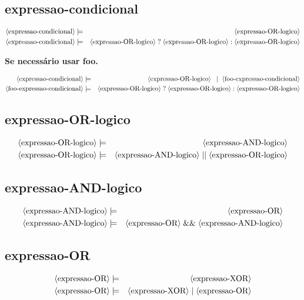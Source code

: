 \documentclass[12pt,a4papper]{article}
\newcommand{\pn}[1]{\langle \textnormal{#1} \rangle}
\newcommand{\pp}{\models}
\newcommand{\oo}{\; \mid \;}
\newcommand{\ww}{\;}
\newcommand{\sm}[1]{\textnormal{#1}}
\begin{document}
\begin{landscape}
\subsection{expressao-condicional}
\begin{eqnarray}
\pn{expressao-condicional} &\pp& \pn{expressao-OR-logico} \\
\pn{expressao-condicional} &\pp& \pn{expressao-OR-logico} \ww \sm{?} \ww \pn{expressao-OR-logico} \ww \sm{:} \ww \pn{expressao-OR-logico}
\end{eqnarray}

\textbf{Se necessário usar foo.}

\begin{eqnarray}
\pn{expressao-condicional} &\pp& \pn{expressao-OR-logico} \ww \oo \pn{foo-expressao-condicional}  \\
\pn{foo-expressao-condicional} &\pp& \pn{expressao-OR-logico} \ww \sm{?} \ww \pn{expressao-OR-logico} \ww \sm{:} \ww \pn{expressao-OR-logico}
\end{eqnarray}



\subsection{expressao-OR-logico}
\begin{eqnarray}
\pn{expressao-OR-logico} &\pp& \pn{expressao-AND-logico} \\
\pn{expressao-OR-logico} &\pp& \pn{expressao-AND-logico} \ww  \sm{$\mid\mid$} \ww \pn{expressao-OR-logico} 
\end{eqnarray}


\subsection{expressao-AND-logico}
\begin{eqnarray}
\pn{expressao-AND-logico} &\pp& \pn{expressao-OR} \\
\pn{expressao-AND-logico} &\pp& \pn{expressao-OR} \ww \sm{\&\&} \ww \pn{expressao-AND-logico} 
\end{eqnarray}


\subsection{expressao-OR}
\begin{eqnarray}
\pn{expressao-OR} &\pp& \pn{expressao-XOR} \\
\pn{expressao-OR} &\pp& \pn{expressao-XOR} \ww \sm{$\mid$} \ww \pn{expressao-OR}
\end{eqnarray}



\end{landscape}
\end{document}
